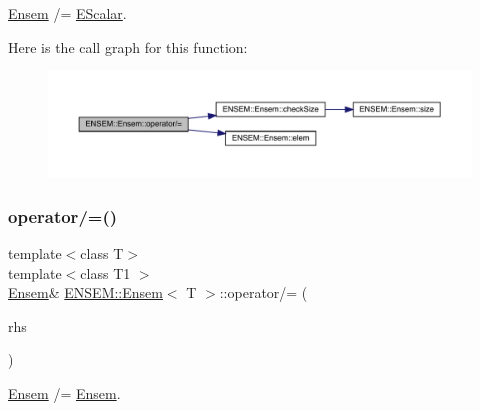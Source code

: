 \mbox{\hyperlink{classENSEM_1_1Ensem}{Ensem}} /= \mbox{\hyperlink{classENSEM_1_1EScalar}{E\+Scalar}}. 

Here is the call graph for this function\+:
\nopagebreak
\begin{figure}[H]
\begin{center}
\leavevmode
\includegraphics[width=350pt]{d7/d3e/classENSEM_1_1Ensem_a32bf70c0844ce98695151457bf9df018_cgraph}
\end{center}
\end{figure}
\mbox{\label{classENSEM_1_1Ensem_aa0d7f0d69f4c1c1adc551c91abcf271a}} 
\subsubsection{\texorpdfstring{operator/=()}{operator/=()}\hspace{0.1cm}{\footnotesize\ttfamily [3/4]}}
{\footnotesize\ttfamily template$<$class T$>$ \\
template$<$class T1 $>$ \\
\mbox{\hyperlink{classENSEM_1_1Ensem}{Ensem}}\& \mbox{\hyperlink{classENSEM_1_1Ensem}{E\+N\+S\+E\+M\+::\+Ensem}}$<$ T $>$\+::operator/= (\begin{DoxyParamCaption}\item[{const \mbox{\hyperlink{classENSEM_1_1Ensem}{Ensem}}$<$ T1 $>$ \&}]{rhs }\end{DoxyParamCaption})\hspace{0.3cm}{\ttfamily [inline]}}



\mbox{\hyperlink{classENSEM_1_1Ensem}{Ensem}} /= \mbox{\hyperlink{classENSEM_1_1Ensem}{Ensem}}. 

